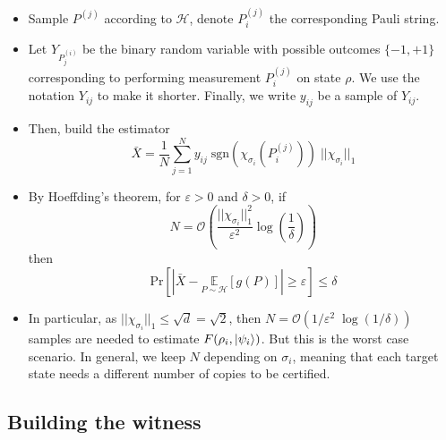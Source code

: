 \documentclass[a4paper,unpublished,onecolumn,11pt]{quantumarticle}
\begin{document}
\begin{itemize}
    \item Sample $P^{(j)}$ according to $\mathcal H$, denote $P_i^{(j)}$ the corresponding Pauli string.
    \item Let $Y_{P_j^{(i)}}$ be the binary random variable with possible outcomes $\{-1, +1\}$ corresponding to performing measurement $P_i^{(j)}$ on state $\rho$. We use the notation $Y_{ij}$ to make it shorter. Finally, we write $y_{ij}$ be a sample of $Y_{ij}$.
    \item Then, build the estimator
    \begin{equation}
        \bar X = \dfrac{1}{N}\sum_{j=1}^N y_{ij}\; \mathrm{sgn}(\chi_{\sigma_i}(P_i ^{(j)})) \; ||\chi_{\sigma_i}||_1 
    \end{equation}
    \item By Hoeffding's theorem, for $\varepsilon>0$ and $\delta >0$, if
    \begin{equation}
        N= \mathcal O\left(
        \dfrac{||\chi_{\sigma_i}||_1^2 }{\varepsilon^2} \log\left(\dfrac{1}{\delta}\right)
        \right)
    \end{equation}
    then
    \begin{equation}
        \mathrm{Pr}\left[
        \left|{\bar X - \underset{P\sim \mathcal H}{\mathbb E}[g(P)]}\right| \geq \varepsilon
        \right] \leq \delta
    \end{equation}
    \item In particular, as $||\chi_{\sigma_i}||_1 \leq \sqrt{d}=\sqrt 2$, then $N = \mathcal O(1/\varepsilon^2 \; \log(1/\delta))$ samples are needed to estimate $F(\rho_i, \ket{\psi_i})$. But this is the worst case scenario. In general, we keep $N$ depending on $\sigma_i$, meaning that each target state needs a different number of copies to be certified.
\end{itemize}

\subsection{Building the witness}
\end{document}
